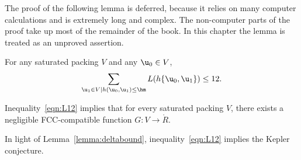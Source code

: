 \figJXEHXQY %

The proof of the following lemma is deferred, because it relies on
many computer calculations and is extremely long and complex.  The
non-computer parts of the proof take up most of the remainder of the
book.  In this chapter the lemma is treated as an unproved assertion.


\begin{lemma*}\label{conj:L12} 
  For any  saturated packing $ V$ and any $ \u_0\in V$,
\begin{equation}\label{eqn:L12} 
\sum_{ \u_1\in V\mid h( \u_0, \u_1)\le \hm} L(h\{\u_0, \u_1\}) \le 12.
\end{equation}
\end{lemma*}

\begin{lemma}[]\label{theorem:mk2} 
Inequality~\eqref{eqn:L12} implies
that for every saturated packing $V$, there exists a negligible FCC-compatible function
$G:V\to \ring{R}$.
\end{lemma}

\begin{remark}\label{rem:L12KC}
In light of Lemma~\ref{lemma:deltabound}, inequality~\ref{eqn:L12}
implies the Kepler conjecture. 
\end{remark}

